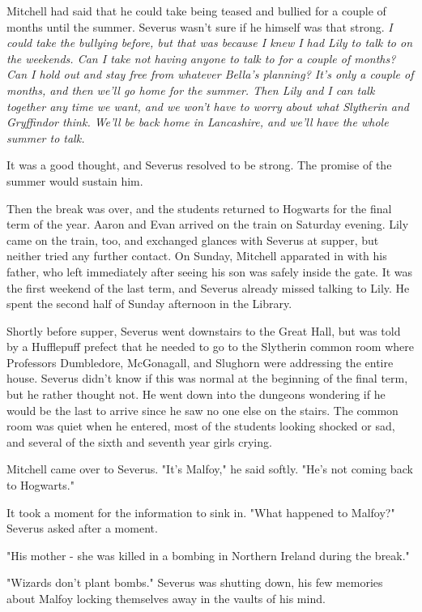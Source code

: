 \documentclass[a4paper,11pt]{article}
\begin{document}
Mitchell had said that he could take being teased and bullied for a couple of months until the summer. Severus wasn't sure if he himself was that strong. \emph{I could take the bullying before, but that was because I knew I had Lily to talk to on the weekends. Can I take not having anyone to talk to for a couple of months? Can I hold out and stay free from whatever Bella's planning? It's only a couple of months, and then we'll go home for the summer. Then Lily and I can talk together any time we want, and we won't have to worry about what Slytherin and Gryffindor think. We'll be back home in Lancashire, and we'll have the whole summer to talk.}

It was a good thought, and Severus resolved to be strong. The promise of the summer would sustain him.

Then the break was over, and the students returned to Hogwarts for the final term of the year. Aaron and Evan arrived on the train on Saturday evening. Lily came on the train, too, and exchanged glances with Severus at supper, but neither tried any further contact. On Sunday, Mitchell apparated in with his father, who left immediately after seeing his son was safely inside the gate. It was the first weekend of the last term, and Severus already missed talking to Lily. He spent the second half of Sunday afternoon in the Library.

Shortly before supper, Severus went downstairs to the Great Hall, but was told by a Hufflepuff prefect that he needed to go to the Slytherin common room where Professors Dumbledore, McGonagall, and Slughorn were addressing the entire house. Severus didn't know if this was normal at the beginning of the final term, but he rather thought not. He went down into the dungeons wondering if he would be the last to arrive since he saw no one else on the stairs. The common room was quiet when he entered, most of the students looking shocked or sad, and several of the sixth and seventh year girls crying.

Mitchell came over to Severus. "It's Malfoy," he said softly. "He's not coming back to Hogwarts."

It took a moment for the information to sink in. "What happened to Malfoy?" Severus asked after a moment.

"His mother - she was killed in a bombing in Northern Ireland during the break."

"Wizards don't plant bombs." Severus was shutting down, his few memories about Malfoy locking themselves away in the vaults of his mind.
\end{document}

